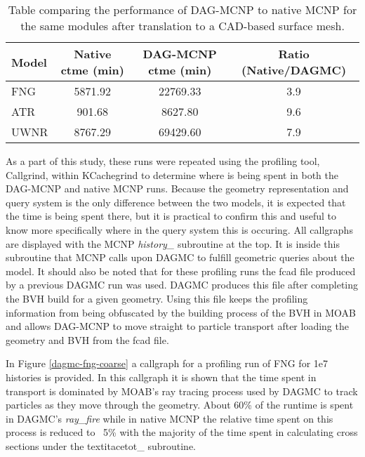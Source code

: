 \begin{table}[H]
  \centering
  \begin{tabular}{l c c c}
    \toprule
    Model & Native ctme (min) & DAG-MCNP ctme (min) & Ratio (Native/DAGMC) \\
    \hline
    FNG   & 5871.92           & 22769.33            & 3.9                  \\
    ATR   & 901.68            & 8627.80             & 9.6                  \\
    UWNR  & 8767.29           & 69429.60            & 7.9                  \\
    \hline
  \end{tabular}
  \caption{Table comparing the performance of DAG-MCNP to native MCNP for the same modules after translation to a CAD-based surface mesh.}
  \label{dag-mcnp-benchmarks}  
\end{table}

As a part of this study, these runs were repeated using the profiling tool,
Callgrind, within KCachegrind to determine where is being spent in both the
DAG-MCNP and native MCNP runs. Because the geometry representation and query
system is the only difference between the two models, it is expected that the
time is being spent there, but it is practical to confirm this and useful to
know more specifically where in the query system this is occuring. All
callgraphs are displayed with the MCNP \textit{history\_} subroutine at the
top. It is inside this subroutine that MCNP calls upon DAGMC to fulfill
geometric queries about the model. It should also be noted that for these
profiling runs the fcad file produced by a previous DAGMC run was used. DAGMC
produces this file after completing the BVH build for a given geometry. Using
this file keeps the profiling information from being obfuscated by the building
process of the BVH in MOAB and allows DAG-MCNP to move straight to particle
transport after loading the geometry and BVH from the fcad file.

In Figure \ref{dagmc-fng-coarse} a callgraph for a profiling run of FNG for 1e7
histories is provided. In this callgraph it is shown that the time spent in
transport is dominated by MOAB's ray tracing process used by DAGMC to track
particles as they move through the geometry. About 60\% of the runtime is spent
in DAGMC's \textit{ray\_fire} while in native MCNP the relative time spent on
this process is reduced to ~5\% with the majority of the time spent in
calculating cross sections under the textit{acetot\_} subroutine.

